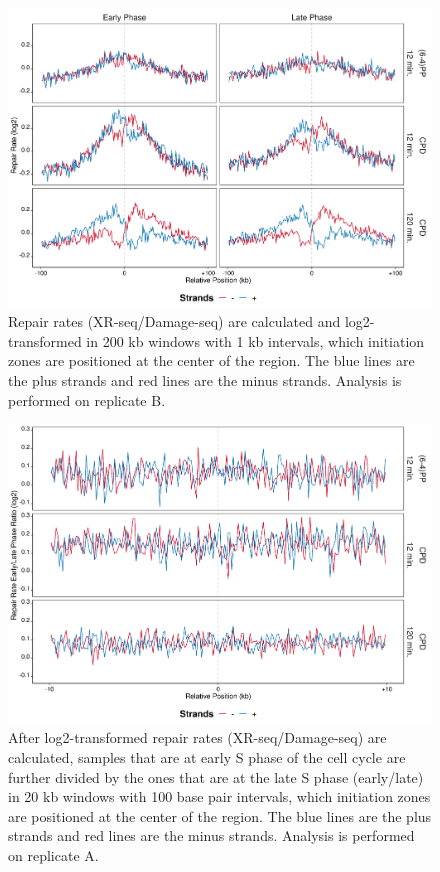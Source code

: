 \begin{figure}[H]
\begin{center}
\includegraphics[width=\textwidth]{Chapters/7_appendix/figures/supfig37}
\caption[Repair rate of initiation zones in 200 kb (replicate B).]{Repair rates (XR-seq/Damage-seq) are calculated and log2-transformed in 200 kb windows with 1 kb intervals, which initiation zones are positioned at the center of the region. The blue lines are the plus strands and red lines are the minus strands. Analysis is performed on replicate B.}
\label{supfig:rr200inzonesB}
\end{center}
\end{figure}

\begin{figure}[H]
\begin{center}
\includegraphics[width=\textwidth]{Chapters/7_appendix/figures/supfig38}
\caption[Repair rate early/late ratio of initiation zones in 20 kb (replicate A).]{After log2-transformed repair rates (XR-seq/Damage-seq) are calculated, samples that are at early S phase of the cell cycle are further divided by the ones that are at the late S phase (early/late) in 20 kb windows with 100 base pair intervals, which initiation zones are positioned at the center of the region. The blue lines are the plus strands and red lines are the minus strands. Analysis is performed on replicate A.}
\label{supfig:rrel20inzonesA}
\end{center}
\end{figure}

